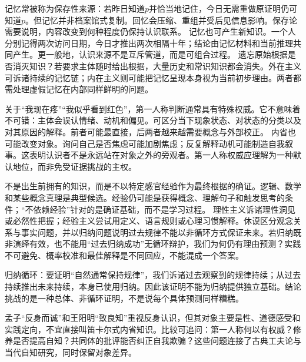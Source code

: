 记忆常被称为保存性来源：若昨日知道$p$并恰当地记住，今日无需重做原证明仍可知道$p$。但记忆并非档案馆式复制。回忆会压缩、重组并受后见信息影响\parencite{loftus2005}。保存论需要说明，内容改变到何种程度仍保持认识联系。 记忆也可产生新知识\parencite{lackey2005}。一个人分别记得两次访问日期，今日才推出两次相隔十年；结论由记忆材料和当前推理共同产生。更一般地，认识来源不是互斥管道，而是可组合过程。 遗忘原始根据是否消灭知识？若要求主体随时给出根据，大量历史和常识知识都会消失。外在主义可诉诸持续的记忆链；内在主义则可能把记忆呈现本身视为当前初步理由。两者都需处理虚假记忆在内部同样鲜明的问题。

关于“我现在疼”“我似乎看到红色”，第一人称判断通常具有特殊权威。它不意味着不可错：主体会误认情绪、动机和偏见。可区分当下现象状态、对状态的分类以及对其原因的解释。前者可能最直接，后两者越来越需要概念与外部校正。 内省也可能改变对象。询问自己是否焦虑可能加剧焦虑；反复解释动机可能制造自我叙事。这表明认识者不是永远站在对象之外的旁观者。第一人称权威应理解为一种默认地位，而非免受证据挑战的主权。

不是出生前拥有的知识，而是不以特定感官经验作为最终根据的确证。逻辑、数学和某些概念真理是典型候选。经验仍可能是获得概念、理解句子和触发思考的条件；“不依赖经验”针对的是确证基础，而不是学习过程。 理性主义诉诸理性洞见或必然性把握\parencite{bonjour1998}；经验主义尝试用定义、语言规则或心理习惯解释。休谟区分观念关系与事实问题，并以归纳问题说明过去规律不能以非循环方式保证未来\parencite{hume2000}。若归纳既非演绎有效，也不能用“过去归纳成功”无循环辩护，我们为何仍有理由预测？实践不可避免、概率校准和最佳解释是不同回应，不能混成一个答案。

\begin{argumentbox}
归纳循环：要证明“自然通常保持规律”，我们诉诸过去观察到的规律持续；从过去持续推出未来持续，本身已使用归纳。因此该证明不能为归纳提供独立基础。结论挑战的是一种总体、非循环证明，不是说每个具体预测同样糟糕。
\end{argumentbox}

\begin{comparison}
孟子“反身而诚”和王阳明“致良知”重视反身认识，但其对象主要是性、道德感受和实践定向，不宜直接叫笛卡尔式内省知识\parencite{mencius2008,tiwald2014}。比较可追问：第一人称何以有权威？修养是否提高自知？共同体的批评能否纠正自我欺骗？这些问题连接了古典工夫论与当代自知研究，同时保留对象差异。
\end{comparison}

